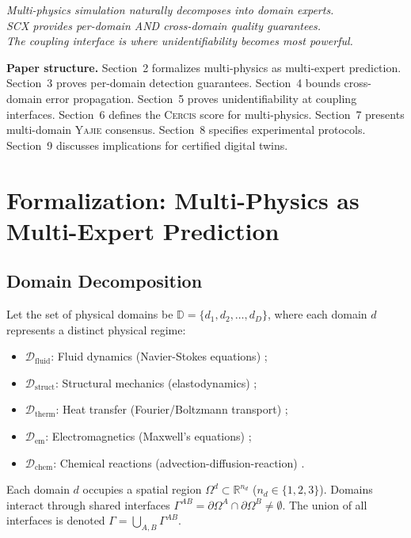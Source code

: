 \documentclass[11pt,a4paper]{article}
\theoremstyle{definition}
\newcommand{\Yajie}{\textsc{Yajie}}
\newcommand{\Cercis}{\textsc{Cercis}}
\newcommand{\SCX}{\textsc{SCX}}
\newcommand{\R}{\mathbb{R}}
\newcommand{\domFluid}{\mathcal{D}_{\mathrm{fluid}}}
\newcommand{\domStruct}{\mathcal{D}_{\mathrm{struct}}}
\newcommand{\domThermal}{\mathcal{D}_{\mathrm{therm}}}
\newcommand{\domEM}{\mathcal{D}_{\mathrm{em}}}
\newcommand{\domChem}{\mathcal{D}_{\mathrm{chem}}}
\newcommand{\domains}{\mathbb{D}}
\newcommand{\interface}{\Gamma}
\begin{document}
\begin{center}
\emph{Multi-physics simulation naturally decomposes into domain experts.\\
\SCX{} provides per-domain AND cross-domain quality guarantees.\\
The coupling interface is where unidentifiability becomes most powerful.}
\end{center}

\textbf{Paper structure.} Section~2 formalizes multi-physics as multi-expert prediction. Section~3 proves per-domain detection guarantees. Section~4 bounds cross-domain error propagation. Section~5 proves unidentifiability at coupling interfaces. Section~6 defines the \Cercis{} score for multi-physics. Section~7 presents multi-domain \Yajie{} consensus. Section~8 specifies experimental protocols. Section~9 discusses implications for certified digital twins.

\section{Formalization: Multi-Physics as Multi-Expert Prediction }
\label{sec:formulation}

\subsection{Domain Decomposition }

Let the set of physical domains be $\domains = \{d_1, d_2, \ldots, d_D\}$, where each domain $d$ represents a distinct physical regime:

\begin{itemize}
    \item $\domFluid$: Fluid dynamics (Navier-Stokes equations) ;
    \item $\domStruct$: Structural mechanics (elastodynamics) ;
    \item $\domThermal$: Heat transfer (Fourier/Boltzmann transport) ;
    \item $\domEM$: Electromagnetics (Maxwell's equations) ;
    \item $\domChem$: Chemical reactions (advection-diffusion-reaction) .
\end{itemize}

Each domain $d$ occupies a spatial region $\Omega^d \subset \R^{n_d}$ ($n_d \in \{1,2,3\}$). Domains interact through shared interfaces $\interface^{AB} = \partial\Omega^A \cap \partial\Omega^B \neq \emptyset$. The union of all interfaces is denoted $\interface = \bigcup_{A,B} \interface^{AB}$.
\end{document}
